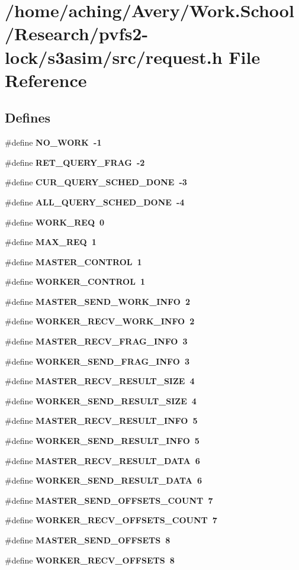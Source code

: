 \section{/home/aching/Avery/Work.School/Research/pvfs2-lock/s3asim/src/request.h File Reference}
\label{request_8h}
\subsection*{Defines}
\begin{CompactItemize}
\item 
\#define \bf{NO\_\-WORK}~-1
\item 
\#define \bf{RET\_\-QUERY\_\-FRAG}~-2
\item 
\#define \bf{CUR\_\-QUERY\_\-SCHED\_\-DONE}~-3
\item 
\#define \bf{ALL\_\-QUERY\_\-SCHED\_\-DONE}~-4
\item 
\#define \bf{WORK\_\-REQ}~0
\item 
\#define \bf{MAX\_\-REQ}~1
\item 
\#define \bf{MASTER\_\-CONTROL}~1
\item 
\#define \bf{WORKER\_\-CONTROL}~1
\item 
\#define \bf{MASTER\_\-SEND\_\-WORK\_\-INFO}~2
\item 
\#define \bf{WORKER\_\-RECV\_\-WORK\_\-INFO}~2
\item 
\#define \bf{MASTER\_\-RECV\_\-FRAG\_\-INFO}~3
\item 
\#define \bf{WORKER\_\-SEND\_\-FRAG\_\-INFO}~3
\item 
\#define \bf{MASTER\_\-RECV\_\-RESULT\_\-SIZE}~4
\item 
\#define \bf{WORKER\_\-SEND\_\-RESULT\_\-SIZE}~4
\item 
\#define \bf{MASTER\_\-RECV\_\-RESULT\_\-INFO}~5
\item 
\#define \bf{WORKER\_\-SEND\_\-RESULT\_\-INFO}~5
\item 
\#define \bf{MASTER\_\-RECV\_\-RESULT\_\-DATA}~6
\item 
\#define \bf{WORKER\_\-SEND\_\-RESULT\_\-DATA}~6
\item 
\#define \bf{MASTER\_\-SEND\_\-OFFSETS\_\-COUNT}~7
\item 
\#define \bf{WORKER\_\-RECV\_\-OFFSETS\_\-COUNT}~7
\item 
\#define \bf{MASTER\_\-SEND\_\-OFFSETS}~8
\item 
\#define \bf{WORKER\_\-RECV\_\-OFFSETS}~8
\end{CompactItemize}


